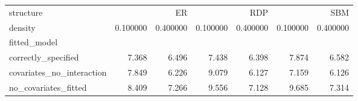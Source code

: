 \begin{tabular}{lrrrrrr}
\toprule
structure & \multicolumn{2}{r}{ER} & \multicolumn{2}{r}{RDP} & \multicolumn{2}{r}{SBM} \\
density & 0.100000 & 0.400000 & 0.100000 & 0.400000 & 0.100000 & 0.400000 \\
fitted_model &  &  &  &  &  &  \\
\midrule
correctly_specified & 7.368 & 6.496 & 7.438 & 6.398 & 7.874 & 6.582 \\
covariates_no_interaction & 7.849 & 6.226 & 9.079 & 6.127 & 7.159 & 6.126 \\
no_covariates_fitted & 8.409 & 7.266 & 9.556 & 7.128 & 9.685 & 7.314 \\
\bottomrule
\end{tabular}
